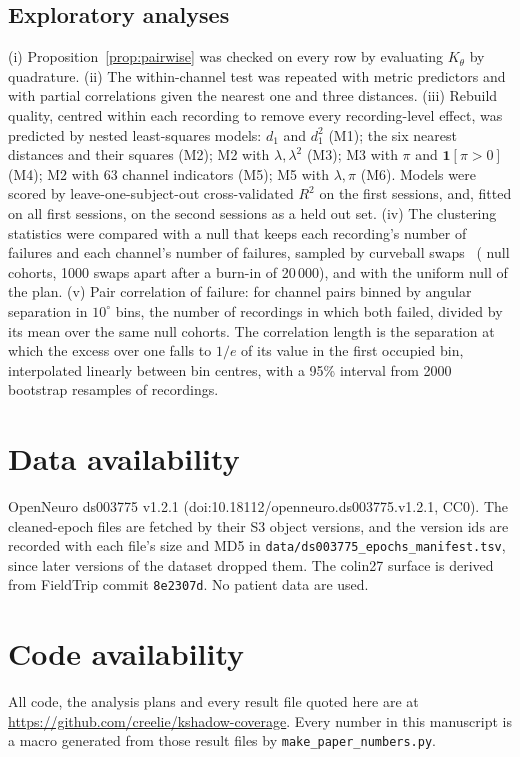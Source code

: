 \documentclass[11pt]{amsart}
\theoremstyle{definition}
\theoremstyle{remark}
\begin{document}
\subsection*{Exploratory analyses}
(i) Proposition~\ref{prop:pairwise} was checked on every row by evaluating
$K_\theta$ by quadrature. (ii) The within-channel test was repeated with
metric predictors and with partial correlations given the nearest one and
three distances. (iii) Rebuild quality, centred within each recording to
remove every recording-level effect, was predicted by nested least-squares
models: $d_1$ and $d_1^2$ (M1); the six nearest distances and their squares
(M2); M2 with $\lambda,\lambda^2$ (M3); M3 with $\pi$ and $\mathbf 1[\pi>0]$
(M4); M2 with 63 channel indicators (M5); M5 with $\lambda,\pi$ (M6). Models
were scored by leave-one-subject-out cross-validated $R^2$ on the first
sessions, and, fitted on all first sessions, on the second sessions as a held
out set. (iv) The clustering statistics were compared with a null that keeps
each recording's number of failures and each channel's number of failures,
sampled by curveball swaps~\cite{Strona2014} (\mgNull{} null cohorts, 1000
swaps apart after a burn-in of 20\,000), and with the uniform null of the plan.
(v) Pair correlation of failure: for channel pairs binned by angular
separation in $10^\circ$ bins, the number of recordings in which both failed,
divided by its mean over the same null cohorts. The correlation length is the
separation at which the excess over one falls to $1/e$ of its value in the
first occupied bin, interpolated linearly between bin centres, with a 95\%
interval from 2000 bootstrap resamples of recordings.


\section*{Data availability}
OpenNeuro ds003775 v1.2.1 (doi:10.18112/openneuro.ds003775.v1.2.1, CC0). The
cleaned-epoch files are fetched by their S3 object versions, and the version
ids are recorded with each file's size and MD5 in
\texttt{data/ds003775\_epochs\_manifest.tsv}, since later versions of the dataset
dropped them. The colin27 surface is derived from FieldTrip commit
\texttt{8e2307d}. No patient data are used.

\section*{Code availability}
All code, the analysis plans and every result file quoted here are at
\url{https://github.com/creelie/kshadow-coverage}. Every number in this
manuscript is a macro generated from those result files by
\texttt{make\_paper\_numbers.py}.
\end{document}
